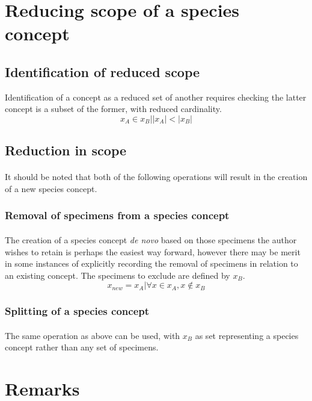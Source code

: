 \documentclass{article}
\begin{document}
   \section{Reducing scope of a species concept}
   \subsection{Identification of reduced scope}
   Identification of a concept as a reduced set of another requires checking the latter concept is a subset of the former, with reduced cardinality.
   \[x_A \in x_B|\left|x_A\right| < \left|x_B\right|\]
   \subsection{Reduction in scope}
   \paragraph{}
   It should be noted that both of the following operations will result in the creation of a new species concept.
   \subsubsection{Removal of specimens from a species concept}
   \paragraph{}
   The creation of a species concept \textit{de novo} based on those specimens the author wishes to retain is perhaps the easiest way forward, however there may be merit in some instances of explicitly recording the removal of specimens in relation to an existing concept. The specimens to exclude are defined by $x_B$.
   \[x_{new} = x_A|\forall x \in x_A, x \notin x_B\] 
   \subsubsection{Splitting of a species concept}
   \paragraph{}
   The same operation as above can be used, with $x_B$ as set representing a species concept rather than any set of specimens.
   
   \section{Remarks}
\end{document}
